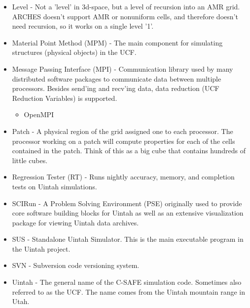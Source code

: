 \begin{itemize}
\item Level - Not a 'level' in 3d-space, but a level of recursion into an
  AMR grid.  ARCHES doesn't support AMR or nonuniform cells, and
  therefore doesn't need recursion, so it works on a single level '1'.

\item Material Point Method (MPM) - The main component for simulating
  structures (physical objects) in the UCF.

\item Message Passing Interface (MPI) - Communication library used by many
  distributed software packages to communicate data between multiple
  processors.  Besides send'ing and recv'ing data, data
  reduction (UCF Reduction Variables) is supported.
  \begin{itemize}
    \item OpenMPI
  \end{itemize}

\item Patch - A physical region of the grid assigned one to each
  processor.  The processor working on a patch will compute properties
  for each of the cells contained in the patch.  Think of this as a big
  cube that contains hundreds of little cubes.

\item Regression Tester (RT) - Runs nightly accuracy, memory, and
  completion tests on Uintah simulations.


\item SCIRun - A Problem Solving Environment (PSE) originally used to
  provide core software building blocks for Uintah as well as an
  extensive visualization package for viewing Uintah data archives.

\item SUS - Standalone Uintah Simulator.  This is the main executable
  program in the Uintah project.

\item SVN - Subversion code versioning system.

\item Uintah - The general name of the C-SAFE simulation code.
  Sometimes also referred to as the UCF.  The name comes from the
  Uintah mountain range in Utah.


\end{itemize}
